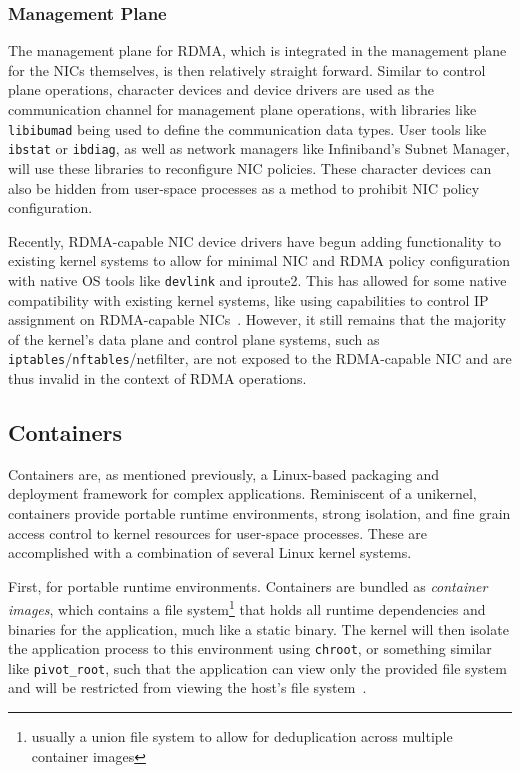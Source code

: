 \documentclass[12pt,titlepage]{article}
\begin{document}
\subsubsection{Management Plane}
The management plane for RDMA, which is integrated in the management plane for the NICs themselves, is then relatively straight forward.
Similar to control plane operations, character devices and device drivers are used as the communication channel for management plane operations, with libraries like \texttt{libibumad} being used to define the communication data types.
User tools like \texttt{ibstat} or \texttt{ibdiag}, as well as network managers like Infiniband's Subnet Manager, will use these libraries to reconfigure NIC policies.
These character devices can also be hidden from user-space processes as a method to prohibit NIC policy configuration.

Recently, RDMA-capable NIC device drivers have begun adding functionality to existing kernel systems to allow for minimal NIC and RDMA policy configuration with native OS tools like \texttt{devlink} and iproute2.
This has allowed for some native compatibility with existing kernel systems, like using capabilities to control IP assignment on RDMA-capable NICs~\cite{mlnxofedmanual}.
However, it still remains that the majority of the kernel's data plane and control plane systems, such as \texttt{iptables}/\texttt{nftables}/netfilter, are not exposed to the RDMA-capable NIC and are thus invalid in the context of RDMA operations.

\subsection{Containers}\label{subsec:Containers}
Containers are, as mentioned previously, a Linux-based packaging and deployment framework for complex applications.
Reminiscent of a unikernel, containers provide portable runtime environments, strong isolation, and fine grain access control to kernel resources for user-space processes.
These are accomplished with a combination of several Linux kernel systems.

First, for portable runtime environments.
Containers are bundled as \textit{container images}, which contains a file system\footnote{usually a union file system to allow for deduplication across multiple container images} that holds all runtime dependencies and binaries for the application, much like a static binary.
The kernel will then isolate the application process to this environment using \texttt{chroot}, or something similar like \texttt{pivot\_root}, such that the application can view only the provided file system and will be restricted from viewing the host's file system~\cite{dockerunderthehood}.
\end{document}
